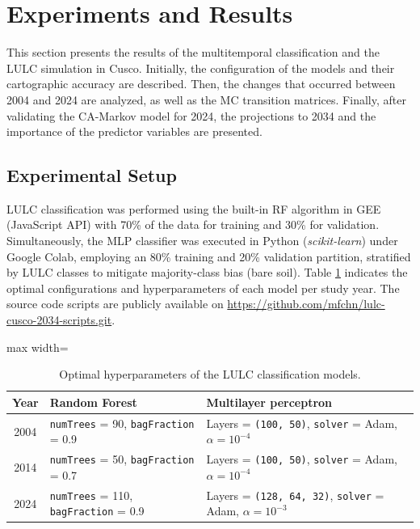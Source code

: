 \documentclass[runningheads]{llncs}
\begin{document}
\section{Experiments and Results}
\label{sec:results}

This section presents the results of the multitemporal classification and the LULC simulation in Cusco. Initially, the configuration of the models and their cartographic accuracy are described. Then, the changes that occurred between 2004 and 2024 are analyzed, as well as the MC transition matrices. Finally, after validating the CA-Markov model for 2024, the projections to 2034 and the importance of the predictor variables are presented. 

\subsection{Experimental Setup}
\label{subsec:configuracion_experimental}

LULC classification was performed using the built-in RF algorithm in GEE (JavaScript API) with 70\% of the data for training and 30\% for validation. Simultaneously, the MLP classifier was executed in Python (\textit{scikit-learn}) under Google Colab, employing an 80\% training and 20\% validation partition, stratified by LULC classes to mitigate majority-class bias (bare soil). Table \ref{tab:setup_clasificacion_lulc} indicates the optimal configurations and hyperparameters of each model per study year. The source code scripts are publicly available on \url{https://github.com/mfchn/lulc-cusco-2034-scripts.git}.

\begin{table}[t]
\centering
\caption{Optimal hyperparameters of the LULC classification models.}
\label{tab:setup_clasificacion_lulc}
\small
\begin{adjustbox}{max width=\textwidth}
\setlength{\tabcolsep}{6pt}
\begin{tabular}{c l l}
\hline
Year & Random Forest & Multilayer perceptron \\
\hline
2004 & \texttt{numTrees} = 90, \texttt{bagFraction} = 0.9 & Layers = \texttt{(100, 50)}, \texttt{solver} = Adam, $\alpha = 10^{-4}$ \\
2014 & \texttt{numTrees} = 50, \texttt{bagFraction} = 0.7 & Layers = \texttt{(100, 50)}, \texttt{solver} = Adam, $\alpha = 10^{-4}$ \\
2024 & \texttt{numTrees} = 110, \texttt{bagFraction} = 0.9 & Layers = \texttt{(128, 64, 32)}, \texttt{solver} = Adam, $\alpha = 10^{-3}$ \\
\hline
\end{tabular}
\end{adjustbox}
\end{table}
\end{document}
